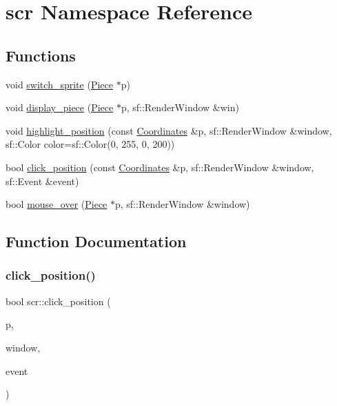 \hypertarget{namespacescr}{}\section{scr Namespace Reference}
\label{namespacescr}
\subsection*{Functions}
\begin{DoxyCompactItemize}
\item 
void \mbox{\hyperlink{namespacescr_a7b91c934af8545eebc19222fe7a756ab}{switch\+\_\+sprite}} (\mbox{\hyperlink{class_piece}{Piece}} $\ast$p)
\item 
void \mbox{\hyperlink{namespacescr_ab6ad379b890e9ea5edf6211b4ea1e160}{display\+\_\+piece}} (\mbox{\hyperlink{class_piece}{Piece}} $\ast$p, sf\+::\+Render\+Window \&win)
\item 
void \mbox{\hyperlink{namespacescr_afbf344f09162239b14701105f01e1671}{highlight\+\_\+position}} (const \mbox{\hyperlink{class_coordinates}{Coordinates}} \&p, sf\+::\+Render\+Window \&window, sf\+::\+Color color=sf\+::\+Color(0, 255, 0, 200))
\item 
bool \mbox{\hyperlink{namespacescr_a6cf89150981812b9b3ed4144462f12d6}{click\+\_\+position}} (const \mbox{\hyperlink{class_coordinates}{Coordinates}} \&p, sf\+::\+Render\+Window \&window, sf\+::\+Event \&event)
\item 
bool \mbox{\hyperlink{namespacescr_a10f589a004aed2b681476e3cf0c02bfb}{mouse\+\_\+over}} (\mbox{\hyperlink{class_piece}{Piece}} $\ast$p, sf\+::\+Render\+Window \&window)
\end{DoxyCompactItemize}


\subsection{Function Documentation}
\mbox{\label{namespacescr_a6cf89150981812b9b3ed4144462f12d6}} 
\subsubsection{\texorpdfstring{click\_position()}{click\_position()}}
{\footnotesize\ttfamily bool scr\+::click\+\_\+position (\begin{DoxyParamCaption}\item[{const \mbox{\hyperlink{class_coordinates}{Coordinates}} \&}]{p,  }\item[{sf\+::\+Render\+Window \&}]{window,  }\item[{sf\+::\+Event \&}]{event }\end{DoxyParamCaption})}



